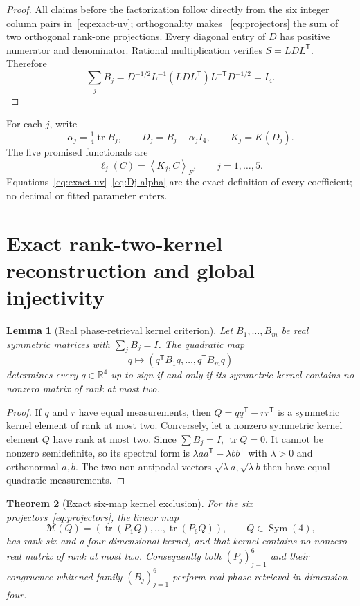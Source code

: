 \documentclass[12pt]{article}
\newtheorem{theorem}{Theorem}[section]
\newtheorem{lemma}[theorem]{Lemma}
\theoremstyle{definition}
\theoremstyle{remark}
\newcommand{\RR}{\mathbb R}
\newcommand{\tr}{\operatorname{tr}}
\newcommand{\ip}[2]{\left\langle #1,#2\right\rangle}
\begin{document}
\begin{proof}
All claims before the factorization follow directly from the six integer
column pairs in~\eqref{eq:exact-uv}; orthogonality makes
~\eqref{eq:projectors} the sum of two orthogonal rank-one projections.
Every diagonal entry of $D$ has positive numerator and denominator.
Rational multiplication verifies $S=LDL^\mathsf T$.  Therefore
\[
\sum_jB_j
=D^{-1/2}L^{-1}(LDL^\mathsf T)L^{-\mathsf T}D^{-1/2}=I_4.
\]
\end{proof}

For each $j$, write
\begin{equation}\label{eq:Dj-alpha}
 \alpha_j=\tfrac14\tr B_j,\qquad
 D_j=B_j-\alpha_jI_4,\qquad K_j=K(D_j).
\end{equation}
The five promised functionals are
\begin{equation}\label{eq:functionals}
 \ell_j(C)=\ip{K_j}{C}_F,\qquad j=1,\ldots,5.
\end{equation}
Equations~\eqref{eq:exact-uv}--\eqref{eq:Dj-alpha} are the exact definition of
every coefficient; no decimal or fitted parameter enters.

\section{Exact rank-two-kernel reconstruction and global injectivity}
\label{sec:certificate}

\begin{lemma}[Real phase-retrieval kernel criterion]
\label{lem:rank-two-kernel}
Let $B_1,\ldots,B_m$ be real symmetric matrices with
$\sum_jB_j=I$.  The quadratic map
\[
 q\longmapsto(q^\mathsf TB_1q,\ldots,q^\mathsf TB_mq)
\]
determines every $q\in\RR^4$ up to sign if and only if its symmetric kernel
contains no nonzero matrix of rank at most two.
\end{lemma}

\begin{proof}
If $q$ and $r$ have equal measurements, then
$Q=qq^\mathsf T-rr^\mathsf T$ is a symmetric kernel element of rank at most
two.  Conversely, let a nonzero symmetric kernel element $Q$ have rank at
most two.  Since $\sum B_j=I$, $\tr Q=0$.  It cannot be nonzero semidefinite,
so its spectral form is $\lambda aa^\mathsf T-\lambda bb^\mathsf T$ with
$\lambda>0$ and orthonormal $a,b$.  The two non-antipodal vectors
$\sqrt\lambda a,\sqrt\lambda b$ then have equal quadratic measurements.
\end{proof}

\begin{theorem}[Exact six-map kernel exclusion]
\label{thm:kernel-certificate}
For the six projectors~\eqref{eq:projectors}, the linear map
\[
 \mathcal M(Q)=(\tr(P_1Q),\ldots,\tr(P_6Q)),
 \qquad Q\in\operatorname{Sym}(4),
\]
has rank six and a four-dimensional kernel, and that kernel contains no
nonzero real matrix of rank at most two.  Consequently both
$(P_j)_{j=1}^6$ and their congruence-whitened family
$(B_j)_{j=1}^6$ perform real phase retrieval in dimension four.
\end{theorem}
\end{document}
